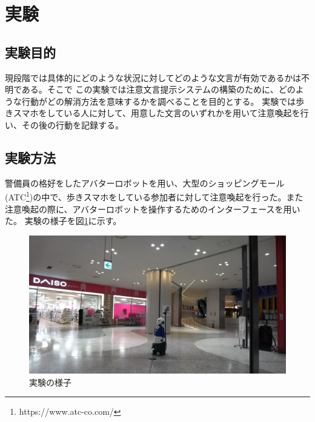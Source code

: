 \documentclass{kuisthesis}
\begin{document}
\section{実験}
\subsection{実験目的}
現段階では具体的にどのような状況に対してどのような文言が有効であるかは不明である。そこで
この実験では注意文言提示システムの構築のために、どのような行動がどの解消方法を意味するかを調べることを目的とする。
実験では歩きスマホをしている人に対して、用意した文言のいずれかを用いて注意喚起を行い、その後の行動を記録する。

\subsection{実験方法}
警備員の格好をしたアバターロボットを用い、大型のショッピングモール(ATC\footnote{https://www.atc-co.com/})の中で、歩きスマホをしている参加者に対して注意喚起を行った。また注意喚起の際に、アバターロボットを操作するためのインターフェースを用いた。
実験の様子を図\ref{fig: Experiment}に示す。
\begin{figure}[H]
  \includegraphics[width=15cm]{img/Experiment.png}
  \caption{実験の様子}
  \label{fig: Experiment}
\end{figure}
\end{document}
